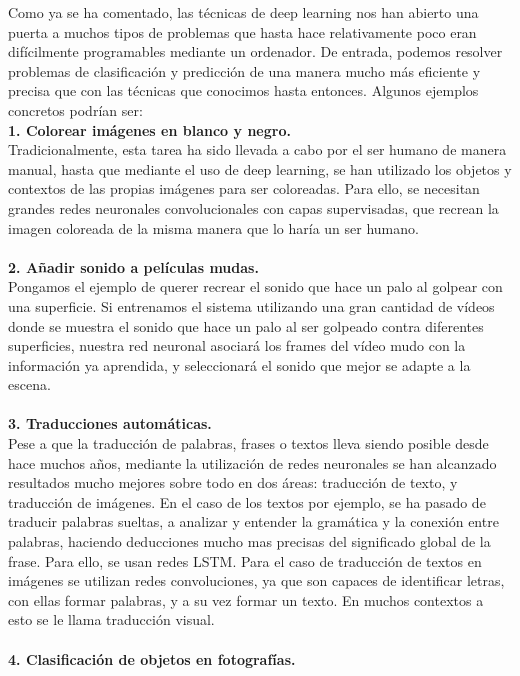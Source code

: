 Como ya se ha comentado, las técnicas de deep learning nos han abierto una puerta a muchos tipos de problemas que hasta hace relativamente poco eran difícilmente programables mediante un ordenador. De entrada, podemos resolver problemas de clasificación y predicción de una manera mucho más eficiente y precisa que con las técnicas que conocimos hasta entonces. Algunos ejemplos concretos podrían ser:\\
\textbf{1. Colorear imágenes en blanco y negro.}\\
Tradicionalmente, esta tarea ha sido llevada a cabo por el ser humano de manera manual, hasta que mediante el uso de deep learning, se han utilizado los objetos y contextos de las propias imágenes para ser coloreadas. Para ello, se necesitan grandes redes neuronales convolucionales con capas supervisadas, que recrean la imagen coloreada de la misma manera que lo haría un ser humano.\\
\\\textbf{2. Añadir sonido a películas mudas.}\\
Pongamos el ejemplo de querer recrear el sonido que hace un palo al golpear con una superficie. Si entrenamos el sistema utilizando una gran cantidad de vídeos donde se muestra el sonido que hace un palo al ser golpeado contra diferentes superficies, nuestra red neuronal asociará los frames del vídeo mudo con la información ya aprendida, y seleccionará el sonido que mejor se adapte a la escena.\\
\\\textbf{3. Traducciones automáticas.}\\
Pese a que la traducción de palabras, frases o textos lleva siendo posible desde hace muchos años, mediante la utilización de redes neuronales se han alcanzado resultados mucho mejores sobre todo en dos áreas: traducción de texto, y traducción de imágenes. En el caso de los textos por ejemplo, se ha pasado de traducir palabras sueltas, a analizar y entender la gramática y la conexión entre palabras, haciendo deducciones mucho mas precisas del significado global de la frase. Para ello, se usan redes LSTM. Para el caso de traducción de textos en imágenes se utilizan redes convoluciones, ya que son capaces de identificar letras, con ellas formar palabras, y a su vez formar un texto. En muchos contextos a esto se le llama traducción visual.\\
\\\textbf{4. Clasificación de objetos en fotografías.}\\
